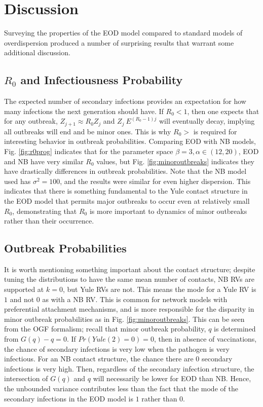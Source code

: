 \documentclass[11pt, twocolumn]{article}
\begin{document}
\section*{Discussion}
Surveying the properties of the EOD model compared to standard models of overdispersion produced a number of surprising results that warrant some additional discussion.
\subsection*{$R_0$ and Infectiousness Probability}
The expected number of secondary infections provides an expectation for how many infections the next generation should have. If $R_0<1$, then one expects that for any outbreak, $Z_{j+1}\approx R_0 Z_j$ and $Z_j~E^{(R_0-1)j}$ will eventually decay, implying all outbreaks will end and be minor ones. This is why $R_0>$ is required for interesting behavior in outbreak probabilities. Comparing EOD with NB models, Fig. \ref{fig:r0prog} indicates that for the parameter space $\beta = 3, \alpha\in (12, 20)$, EOD and NB have very similar $R_0$ values, but Fig. \ref{fig:minoroutbreaks} indicates they have drastically differences in outbreak probabilities. Note that the NB model used has $\sigma^2=100$, and the results were similar for even higher dispersion. This indicates that there is something fundamental to the Yule contact structure in the EOD model that permits major outbreaks to occur even at relatively small $R_0$, demonstrating that $R_0$ is more important to dynamics of minor outbreaks rather than their occurrence.
\subsection*{Outbreak Probabilities}
It is worth mentioning something important about the contact structure; despite tuning the distributions to have the same mean number of contacts, NB RVs are supported at $k=0$, but Yule RVs are not. This means the mode for a Yule RV is $1$ and not $0$ as with a NB RV. This is common for network models with preferential attachment mechanisms, and is more responsible for the disparity in minor outbreak probabilities as in Fig. \ref{fig:minoroutbreaks}. This can be seen from the OGF formalism; recall that minor outbreak probability, $q$ is determined from $G(q)-q=0$. If $Pr(Yule(2)=0)=0$, then in absence of vaccinations, the chance of secondary infections is very low when the pathogen is very infectious. For an NB contact structure, the chance there are $0$ secondary infections is very high. Then, regardless of the secondary infection structure, the intersection of $G(q)$ and $q$ will necessarily be lower for EOD than NB. Hence, the unbounded variance contributes less than the fact that the mode of the secondary infections in the EOD model is $1$ rather than $0$. 
\end{document}
